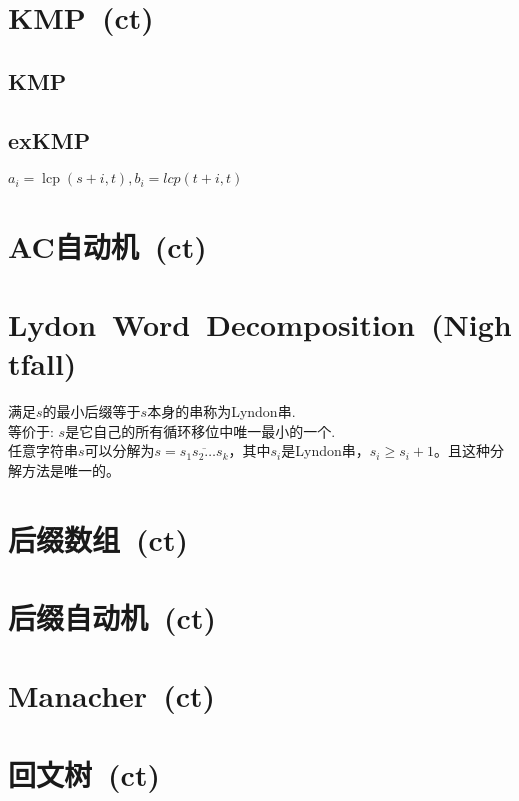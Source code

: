 \newcommand{\lcp}{\operatorname{lcp}}
\section{KMP~\small(ct)}
    \subsection*{KMP}
    \subsection*{exKMP}
        $a_i = \lcp(s + i, t), b_i = lcp(t + i, t) $

\section{AC自动机~\small(ct)}

\section{Lydon~Word~Decomposition~\small(Nightfall)}
    满足$ s $的最小后缀等于$ s $本身的串称为Lyndon串.
    \\等价于: $ s $是它自己的所有循环移位中唯一最小的一个.
    \\任意字符串$ s $可以分解为$ s = \overline{s_1 s_2 \dots s_k} $，其中$ s_i $是Lyndon串，$ s_i \geq s_i + 1 $。且这种分解方法是唯一的。

\section{后缀数组~\small(ct)}

\section{后缀自动机~\small(ct)}

\section{Manacher~\small(ct)}

\section{回文树~\small(ct)}

